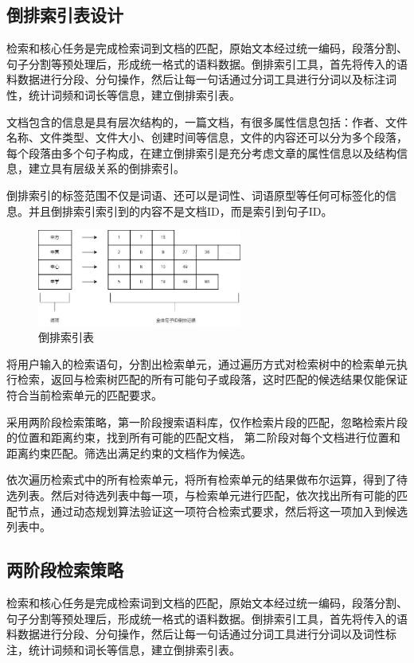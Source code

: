 \documentclass[11pt]{article}
\begin{document}
\begin{CJK*}{UTF8}{gbsn}
\subsection{倒排索引表设计}

检索和核心任务是完成检索词到文档的匹配，原始文本经过统一编码，段落分割、句子分割等预处理后，形成统一格式的语料数据。倒排索引工具，首先将传入的语料数据进行分段、分句操作，然后让每一句话通过分词工具进行分词以及标注词性，统计词频和词长等信息，建立倒排索引表。

文档包含的信息是具有层次结构的，一篇文档，有很多属性信息包括：作者、文件名称、文件类型、文件大小、创建时间等信息，文件的内容还可以分为多个段落，每个段落由多个句子构成，在建立倒排索引是充分考虑文章的属性信息以及结构信息，建立具有层级关系的倒排索引。

倒排索引的标签范围不仅是词语、还可以是词性、词语原型等任何可标签化的信息。并且倒排索引索引到的内容不是文档ID，而是索引到句子ID。

\begin{figure}[h]
	\centering
	\includegraphics[width=0.6\textwidth]{r-index.jpg}
	\caption{倒排索引表}
	\label{fig:example}
\end{figure}

将用户输入的检索语句，分割出检索单元，通过遍历方式对检索树中的检索单元执行检索，返回与检索树匹配的所有可能句子或段落，这时匹配的候选结果仅能保证符合当前检索单元的匹配要求。

采用两阶段检索策略，第一阶段搜索语料库，仅作检索片段的匹配，忽略检索片段的位置和距离约束，找到所有可能的匹配文档， 第二阶段对每个文档进行位置和距离约束匹配。筛选出满足约束的文档作为候选。

依次遍历检索式中的所有检索单元，将所有检索单元的结果做布尔运算，得到了待选列表。然后对待选列表中每一项，与检索单元进行匹配，依次找出所有可能的匹配节点，通过动态规划算法验证这一项符合检索式要求，然后将这一项加入到候选列表中。

\subsection{两阶段检索策略}

检索和核心任务是完成检索词到文档的匹配，原始文本经过统一编码，段落分割、句子分割等预处理后，形成统一格式的语料数据。倒排索引工具，首先将传入的语料数据进行分段、分句操作，然后让每一句话通过分词工具进行分词以及词性标注，统计词频和词长等信息，建立倒排索引表。


\end{CJK*}
\end{document}
